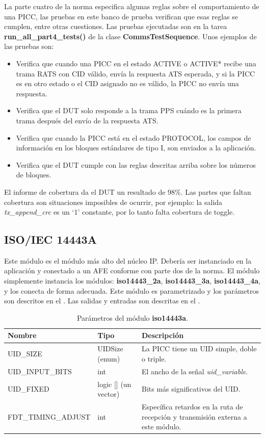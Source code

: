 \documentclass[a4paper, twoside, 11pt]{report}
\begin{document}
La parte cuatro de la norma especifica algunas reglas sobre el comportamiento de una PICC, las pruebas en este banco de prueba verifican que esas reglas se cumplen, entre otras cuestiones. Las pruebas ejecutadas son en la tarea \textbf{run\_all\_part4\_tests()} de la clase \textbf{CommsTestSequence}. Unos ejemplos de las pruebas son:

\begin{itemize}
  \item Verifica que cuando una PICC en el estado ACTIVE o ACTIVE* recibe una trama RATS con CID válido, envía la respuesta ATS esperada, y si la PICC es en otro estado o el CID asignado no es válido, la PICC no envía una respuesta.
  \item Verifica que el DUT solo responde a la trama PPS cuándo es la primera trama después del envío de la respuesta ATS.
  \item Verifica que cuando la PICC está en el estado PROTOCOL, los campos de información en los bloques estándares de tipo I, son enviados a la aplicación.
  \item Verifica que el DUT cumple con las reglas descritas arriba sobre los números de bloques.
\end{itemize}

El informe de cobertura da el DUT un resultado de 98\%. Las partes que faltan cobertura son situaciones imposibles de ocurrir, por ejemplo: la salida \textit{tx\_append\_crc} es un ‘1’ constante, por lo tanto falta cobertura de toggle.

\FloatBarrier
\subsection{ISO/IEC 14443A}

Este módulo es el módulo más alto del núcleo IP. Debería ser instanciado en la aplicación y conectado a un AFE conforme con parte dos de la norma. El módulo simplemente instancia los módulos: \textbf{iso14443\_2a}, \textbf{iso14443\_3a}, \textbf{iso14443\_4a}, y los conecta de forma adecuada. Este módulo es parametrizado y los parámetros son descritos en el . Las salidas y entradas son descritas en el .

\begin{table}[htb]
  \centering
  \tablezebra
  \begin{tabulary}{\linewidth}{l|l|L}
    \textbf{Nombre}&\textbf{Tipo}&\textbf{Descripción} \\
    \hline
    UID\_SIZE&UIDSize (enum)&La PICC tiene un UID simple, doble o triple. \\
    UID\_INPUT\_BITS&int&El ancho de la señal \textit{uid\_variable}. \\
    UID\_FIXED&logic [] (un vector)&Bits más significativos del UID. \\
    FDT\_TIMING\_ADJUST&int&Específica retardos en la ruta de recepción y transmisión externa a este módulo. \\
  \end{tabulary}
  \caption{Parámetros del módulo \textbf{iso14443a}.}
  \label{tab:params_iso14443a}
\end{table}
\end{document}
